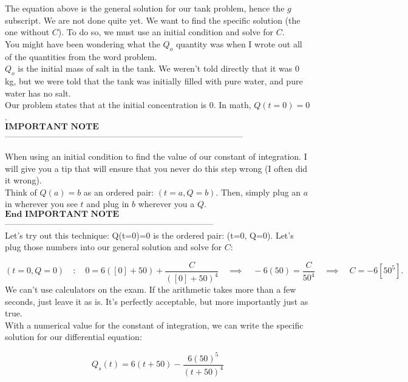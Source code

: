 \documentclass[a4paper,12pt]{article} %
\begin{document}
The equation above is the general solution for our tank problem, hence the $g$ subscript. We are not done quite yet. We want to find the specific solution (the one without $C$). To do so, we must use an initial condition and solve for $C$.\\

You might have been wondering what the $Q_o$ quantity was when I wrote out all of the quantities from the word problem.\\

$Q_o$ is the initial mass of salt in the tank. We weren't told directly that it was 0 kg, but we were told that the tank was initially filled with pure water, and pure water has no salt.\\

Our problem states that at the initial concentration is 0. In math, $Q(t=0)=0$.\\

$\boxed{\textbf{IMPORTANT NOTE}}$------------------------------------------------------------------------------------

When using an initial condition to find the value of our constant of integration. I will give you a tip that will ensure that you never do this step wrong (I often did it wrong).\\

Think of $Q(a) = b$ as an ordered pair: $(t=a,Q=b)$. Then, simply plug an $a$ in wherever you see $t$ and plug in $b$ wherever you a $Q$.\\

$\boxed{\textbf{End IMPORTANT NOTE}}$--------------------------------------------------------------------------\\

Let's try out this technique: Q(t=0)=0 is the ordered pair: (t=0, Q=0). Let's plug those numbers into our general solution and solve for $C$:

$$ (t=0,Q=0)\quad:\quad 0 = 6([0] + 50) + \frac{C}{([0] + 50)^4} \quad\implies\quad  -6 (50) = \frac{C}{50^4}\quad\implies\quad C = -6[50^5].
 $$
We can't use calculators on the exam. If the arithmetic takes more than a few seconds, just leave it as is. It's perfectly acceptable, but more importantly just as true.\\

With a numerical value for the constant of integration, we can write the specific solution for our differential equation:

$$ \boxed{Q_s(t)=6(t+50)-\frac{6(50)^5}{(t+50)^4}} $$
\end{document}
